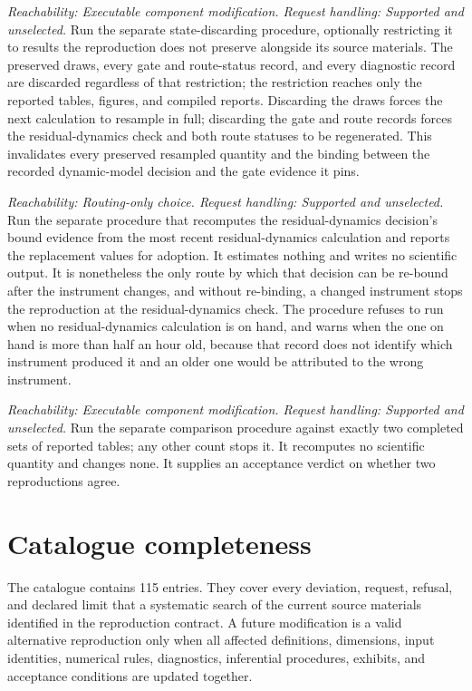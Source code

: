 \documentclass[11pt]{article}
\begin{document}
\begin{description}[style=nextline]
\item[Preserved-state discard.]
\emph{Reachability: Executable component modification. Request handling: Supported and unselected.}
Run the separate state-discarding procedure, optionally restricting it to results the reproduction
does not preserve alongside its source materials. The preserved draws, every gate and route-status record, and every diagnostic
record are discarded regardless of that restriction; the restriction reaches only the reported
tables, figures, and compiled reports. Discarding the draws forces the next calculation to resample in
full; discarding the gate and route records forces the residual-dynamics check and both route
statuses to be regenerated. This invalidates every preserved resampled quantity and the binding
between the recorded dynamic-model decision and the gate evidence it pins.

\item[Residual-dynamics decision regeneration.]
\emph{Reachability: Routing-only choice. Request handling: Supported and unselected.}
Run the separate procedure that recomputes the residual-dynamics decision's bound evidence from the
most recent residual-dynamics calculation and reports the replacement values for adoption. It
estimates nothing and writes no scientific output. It is nonetheless the only route by which that
decision can be re-bound after the instrument changes, and without re-binding, a changed instrument
stops the reproduction at the residual-dynamics check. The procedure refuses to run when no
residual-dynamics calculation is on hand, and warns when the one on hand is more than half an hour
old, because that record does not identify which instrument produced it and an older one would be
attributed to the wrong instrument.

\item[Cross-reproduction table comparison.]
\emph{Reachability: Executable component modification. Request handling: Supported and unselected.}
Run the separate comparison procedure against exactly two completed sets of reported tables; any
other count stops it. It recomputes no scientific quantity and changes none. It supplies an
acceptance verdict on whether two reproductions agree.
\end{description}

\section{Catalogue completeness}

The catalogue contains 115 entries. They cover every deviation, request, refusal, and declared
limit that a systematic search of the current source materials identified in the reproduction
contract. A future modification is a valid alternative reproduction
only when all affected definitions, dimensions, input identities, numerical rules, diagnostics,
inferential procedures, exhibits, and acceptance conditions are updated together.
\end{document}

